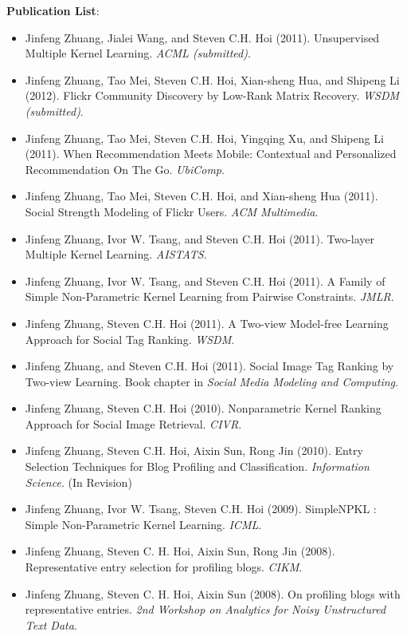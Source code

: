 {\bf Publication List}:


\begin{itemize}
  \item Jinfeng Zhuang, Jialei Wang, and Steven C.H. Hoi (2011). Unsupervised Multiple Kernel Learning. {\em ACML (submitted)}.
  \item Jinfeng Zhuang, Tao Mei, Steven C.H. Hoi, Xian-sheng Hua, and Shipeng Li (2012). Flickr Community Discovery by Low-Rank Matrix Recovery. {\em WSDM (submitted)}.
  \item Jinfeng Zhuang, Tao Mei, Steven C.H. Hoi, Yingqing Xu, and Shipeng Li (2011). When Recommendation Meets Mobile: Contextual and Personalized Recommendation On The Go. {\em UbiComp}.
  \item Jinfeng Zhuang, Tao Mei, Steven C.H. Hoi, and Xian-sheng Hua (2011). Social Strength Modeling of Flickr Users. {\em ACM Multimedia}.
  \item Jinfeng Zhuang, Ivor W. Tsang, and Steven C.H. Hoi (2011). Two-layer Multiple Kernel Learning. {\em AISTATS}.
  \item Jinfeng Zhuang, Ivor W. Tsang, and Steven C.H. Hoi (2011). A Family of Simple Non-Parametric Kernel Learning from Pairwise Constraints. {\em JMLR}.
  \item Jinfeng Zhuang, Steven C.H. Hoi (2011). A Two-view Model-free Learning Approach for Social Tag Ranking. {\em WSDM}.
  \item Jinfeng Zhuang, and Steven C.H. Hoi (2011). Social Image Tag Ranking by Two-view Learning. Book chapter in {\em Social Media Modeling and Computing}.
  \item Jinfeng Zhuang, Steven C.H. Hoi (2010). Nonparametric Kernel Ranking Approach for Social Image Retrieval. {\em CIVR}.
  \item Jinfeng Zhuang, Steven C.H. Hoi, Aixin Sun, Rong Jin (2010). Entry Selection Techniques for Blog Profiling and Classification. {\em Information Science}. (In Revision)
  \item Jinfeng Zhuang, Ivor W. Tsang, Steven C.H. Hoi (2009). SimpleNPKL : Simple Non-Parametric Kernel Learning. {\em ICML}.
  \item Jinfeng Zhuang, Steven C. H. Hoi, Aixin Sun, Rong Jin (2008). Representative entry selection for profiling blogs. {\em CIKM}.
  \item Jinfeng Zhuang, Steven C. H. Hoi, Aixin Sun (2008). On profiling blogs with representative entries. {\em 2nd Workshop on Analytics for Noisy Unstructured Text Data}.
\end{itemize}


